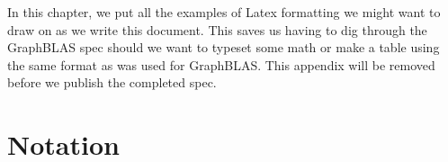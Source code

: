 In this chapter, we put all the examples of Latex formatting we might want to draw on as we 
write this document.   This saves us having to dig through the GraphBLAS spec should we want
to typeset some math or make a table using the same format as was used for GraphBLAS.  This 
appendix will be removed before we publish the completed spec.

\vfill



\section{Notation}

